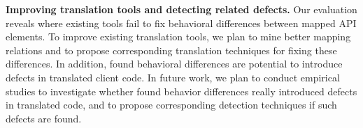\textbf{Improving translation tools and detecting related defects.} Our evaluation reveals where existing tools fail to fix behavioral differences between mapped API elements. To improve existing translation tools, we plan to mine better mapping relations and to propose corresponding translation techniques for fixing these differences. In addition, found behavioral differences are potential to introduce defects in translated client code. In future work, we plan to conduct empirical studies to investigate whether found behavior differences really introduced defects in translated code, and to propose corresponding detection techniques if such defects are found.

